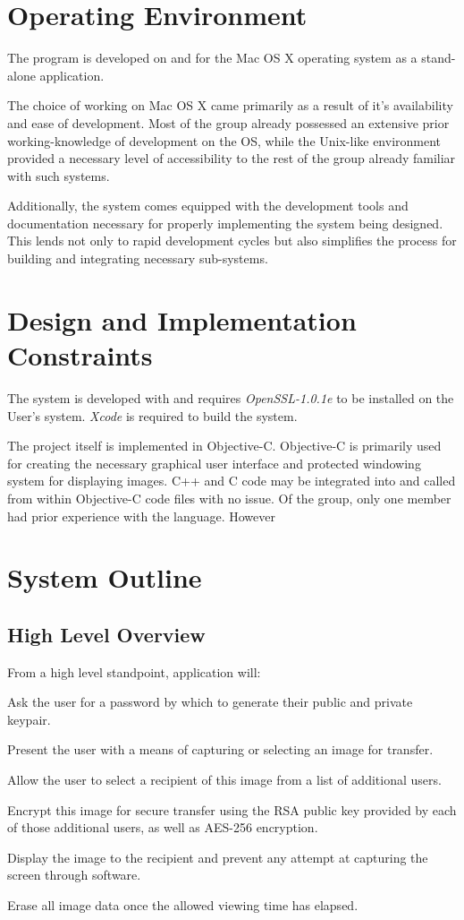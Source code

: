 \documentclass[11pt, a4paper,titlepage]{report}
\begin{document}
\section{Operating Environment}
The program is developed on and for the Mac OS X operating system as a stand-alone application.

The choice of working on Mac OS X came primarily as a result of it's availability and ease of development. Most of the group already possessed an extensive prior working-knowledge of development on the OS, while the Unix-like environment provided a necessary level of accessibility to the rest of the group already familiar with such systems.

Additionally, the system comes equipped with the development  tools and documentation necessary for properly implementing the system being designed. This lends not only to rapid development cycles but also simplifies the process for building and integrating necessary sub-systems.

\section{Design and Implementation Constraints}
The system is developed with and requires \emph{OpenSSL-1.0.1e} to be installed on the User's system. \emph{Xcode} is required to build the system.

The project itself is implemented in Objective-C. Objective-C is primarily used for creating the necessary graphical user interface and protected windowing system for displaying images. C++ and C code may be integrated into and called from within Objective-C code files with no issue. Of the group, only one member had prior experience with the language. However 

\section{System Outline}
\subsection*{High Level Overview}
From a high level standpoint, application will:
\begin{itemize*}
	\item {Ask the user for a password by which to generate their public and private keypair.}
	\item {Present the user with a means of capturing or selecting an image for transfer.}
	\item {Allow the user to select a recipient of this image from a list of additional users.}
	\item {Encrypt this image for secure transfer using the RSA public key provided by each of those additional users, as well as AES-256 encryption.}
	\item {Display the image to the recipient and prevent any attempt at capturing the screen through software.}
	\item {Erase all image data once the allowed viewing time has elapsed.}
\end{itemize*} 
\end{document}
